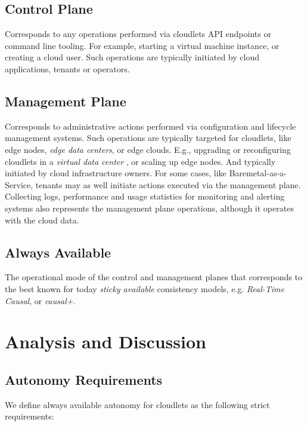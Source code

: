 \documentclass[conference]{IEEEtran}
\begin{document}
\subsection{Control Plane}

Corresponds to any operations performed via cloudlets API endpoints or command
line tooling. For example, starting a virtual machine instance, or creating a
cloud user. Such operations are typically initiated by cloud applications,
tenants or operators.

\subsection{Management Plane}

Corresponds to administrative actions performed via configuration and lifecycle
management systems. Such operations are typically targeted for cloudlets, like
edge nodes, \textit{edge data centers}\cite{b3}, or edge clouds. E.g.,
upgrading or reconfiguring cloudlets in a \textit{virtual data center}
\cite{b3}, or scaling up edge nodes. And typically initiated by cloud
infrastructure owners. For some cases, like Baremetal-as-a-Service, tenants
may as well initiate actions executed via the management plane. Collecting
logs, performance and usage statistics for monitoring and alerting systems also
represents the management plane operations, although it operates with the cloud
data.

\subsection{Always Available}

The operational mode of the control and management planes that corresponds to
the best known for today \textit{sticky available}\cite{b4} consistency models,
e.g. \textit{Real-Time Causal}\cite{b2}, or \textit{causal+}\cite{b1}.

\section{Analysis and Discussion}

\subsection{Autonomy Requirements}

We define always available autonomy for cloudlets as the following strict
requirements:
\end{document}
